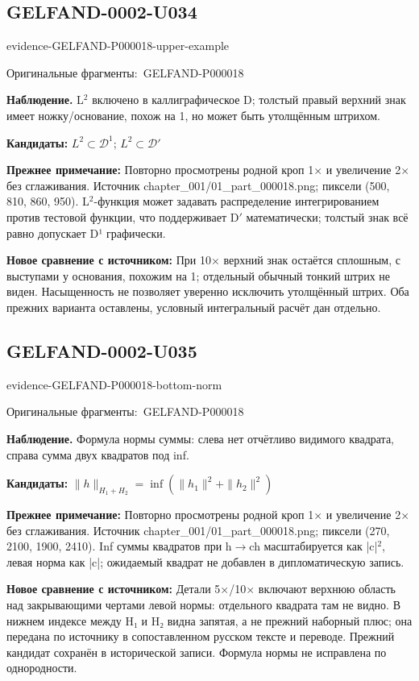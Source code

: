 \documentclass[11pt]{article}
\newcommand{\EvidenceBlock}[4]{%
 \par\smallskip\noindent\begin{minipage}{\linewidth}
 \begin{minipage}[t]{.47\linewidth}\vspace{0pt}\centering
 \csname evidence-#1-#2\endcsname\par
 {\scriptsize\SourceCropCaption\ #1}\par
 \end{minipage}\hfill
 \begin{minipage}[t]{.49\linewidth}\vspace{0pt}\raggedright
 {\small\color{orange!65!black}\textbf{#4} #3}\par
 \end{minipage}
 \end{minipage}\par\smallskip}
\newcommand{\SourceCropCaption}{Оригинальные фрагменты:}\newcommand{\ReadingCaption}{Сомнительное чтение.}\newcommand{\IncompleteCaption}{Неразобранный фрагмент.}\newcommand{\DiagramCaption}{Рисунок и набранное описание.}
\begin{document}
\subsection*{GELFAND-0002-U034}
\EvidenceBlock{GELFAND-P000018}{upper-example}{L\(^2\) включено в каллиграфическое D; толстый правый верхний знак имеет ножку/основание, похож на 1, но может быть утолщённым штрихом.}{Наблюдение.}
\par\smallskip\noindent\textbf{Кандидаты: } \(L^2\subset\mathcal D^1\); \(L^2\subset\mathcal D'\)\par
\par\smallskip\noindent\textbf{Прежнее примечание: } Повторно просмотрены родной кроп 1× и увеличение 2× без сглаживания. Источник chapter\_001/01\_part\_000018.png; пиксели (500, 810, 860, 950). L\(^2\)-функция может задавать распределение интегрированием против тестовой функции, что поддерживает D\(\prime\) математически; толстый знак всё равно допускает D¹ графически.\par
\par\smallskip\noindent\textbf{Новое сравнение с источником: } При 10× верхний знак остаётся сплошным, с выступами у основания, похожим на 1; отдельный обычный тонкий штрих не виден. Насыщенность не позволяет уверенно исключить утолщённый штрих. Оба прежних варианта оставлены, условный интегральный расчёт дан отдельно.\par

\subsection*{GELFAND-0002-U035}
\EvidenceBlock{GELFAND-P000018}{bottom-norm}{Формула нормы суммы: слева нет отчётливо видимого квадрата, справа сумма двух квадратов под inf.}{Наблюдение.}
\par\smallskip\noindent\textbf{Кандидаты: } \(\|h\|_{H_1+H_2}=\inf(\|h_1\|^2+\|h_2\|^2)\)\par
\par\smallskip\noindent\textbf{Прежнее примечание: } Повторно просмотрены родной кроп 1× и увеличение 2× без сглаживания. Источник chapter\_001/01\_part\_000018.png; пиксели (270, 2100, 1900, 2410). Inf суммы квадратов при h\(\to\)ch масштабируется как |c|\(^2\), левая норма как |c|; ожидаемый квадрат не добавлен в дипломатическую запись.\par
\par\smallskip\noindent\textbf{Новое сравнение с источником: } Детали 5×/10× включают верхнюю область над закрывающими чертами левой нормы: отдельного квадрата там не видно. В нижнем индексе между H₁ и H₂ видна запятая, а не прежний наборный плюс; она передана по источнику в сопоставленном русском тексте и переводе. Прежний кандидат сохранён в исторической записи. Формула нормы не исправлена по однородности.\par
\end{document}
